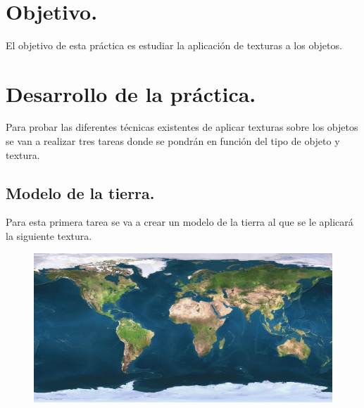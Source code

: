 \documentclass[10pt]{article}
\begin{document}
\begin{center}
 		\\																		%
\vspace{2cm} 																				
\begin{center}																					

 			\end{center}												  						
\end{center}							 											
																					
\newpage																		

\tableofcontents 

\newpage

\section{Objetivo.}

El objetivo de esta práctica es estudiar la aplicación de texturas a los objetos.


\section{Desarrollo de la práctica.}

Para probar las diferentes técnicas existentes de aplicar texturas sobre los objetos se van a realizar tres tareas donde se pondrán en función del tipo de objeto y textura.  \\


\subsection{Modelo de la tierra.}

Para esta primera tarea se va a crear un modelo de la tierra al que se le aplicará la siguiente textura. \\

\begin{figure}[H]
	\begin{center}
	 		\includegraphics[width = 1.00\textwidth]{Imagenes/p3-img1}
	\end{center} 
\end{figure}
\end{document}
